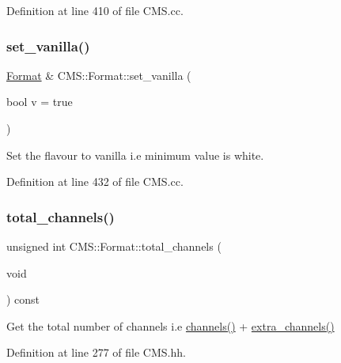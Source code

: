 Definition at line 410 of file C\+M\+S.\+cc.

\mbox{\label{class_c_m_s_1_1_format_ae70a145a08b762c1d15cffe4eb09444b}} 
\subsubsection{\texorpdfstring{set\+\_\+vanilla()}{set\_vanilla()}}
{\footnotesize\ttfamily \hyperlink{class_c_m_s_1_1_format}{Format} \& C\+M\+S\+::\+Format\+::set\+\_\+vanilla (\begin{DoxyParamCaption}\item[{bool}]{v = {\ttfamily true} }\end{DoxyParamCaption})}



Set the flavour to \textquotesingle{}vanilla\textquotesingle{} i.\+e minimum value is white. 



Definition at line 432 of file C\+M\+S.\+cc.

\mbox{\label{class_c_m_s_1_1_format_a2e8ef114e278753a2c3a609ce3e4ce67}} 
\subsubsection{\texorpdfstring{total\+\_\+channels()}{total\_channels()}}
{\footnotesize\ttfamily unsigned int C\+M\+S\+::\+Format\+::total\+\_\+channels (\begin{DoxyParamCaption}\item[{void}]{ }\end{DoxyParamCaption}) const\hspace{0.3cm}{\ttfamily [inline]}}



Get the total number of channels i.\+e \hyperlink{class_c_m_s_1_1_format_a3c58f7bf8ac3d880c0610672e2c2c4de}{channels()} + \hyperlink{class_c_m_s_1_1_format_acd22c5e9c4a61b954b98fced0d7d1874}{extra\+\_\+channels()} 



Definition at line 277 of file C\+M\+S.\+hh.

